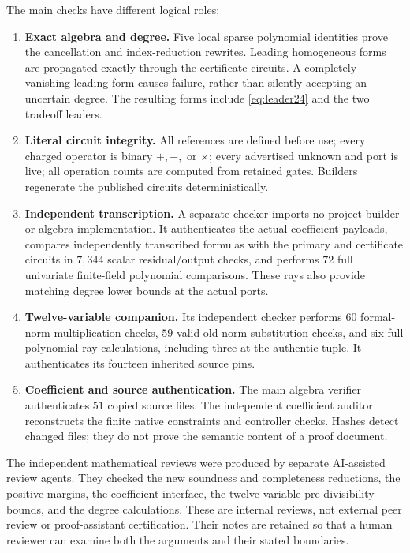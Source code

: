 \documentclass[11pt,a4paper]{article}
\theoremstyle{remark}
\begin{document}
The main checks have different logical roles:
\begin{enumerate}
 \item \textbf{Exact algebra and degree.} Five local sparse polynomial
 identities prove the cancellation and index-reduction rewrites. Leading
 homogeneous forms are propagated exactly through the certificate circuits.
 A completely vanishing leading form causes failure, rather than silently
 accepting an uncertain degree. The resulting forms include
 \eqref{eq:leader24} and the two tradeoff leaders.
 \item \textbf{Literal circuit integrity.} All references are defined before
 use; every charged operator is binary $+,-,$ or $\times$; every advertised
 unknown and port is live; all operation counts are computed from retained
 gates. Builders regenerate the published circuits deterministically.
 \item \textbf{Independent transcription.} A separate checker imports no
 project builder or algebra implementation. It authenticates the actual
 coefficient payloads, compares independently transcribed formulas with the
 primary and certificate circuits in $7{,}344$ scalar residual/output checks,
 and performs $72$ full univariate finite-field polynomial comparisons.
 These rays also provide matching degree lower bounds at the actual ports.
 \item \textbf{Twelve-variable companion.} Its independent checker performs
 $60$ formal-norm multiplication checks, $59$ valid old-norm substitution
 checks, and six full polynomial-ray calculations, including three at the
 authentic tuple. It authenticates its fourteen inherited source pins.
 \item \textbf{Coefficient and source authentication.} The main algebra
 verifier authenticates $51$ copied source files. The independent coefficient
 auditor reconstructs the finite native constraints and controller checks.
 Hashes detect changed files; they do not prove the semantic content of a
 proof document.
\end{enumerate}

The independent mathematical reviews were produced by separate AI-assisted
review agents. They checked the new soundness and completeness reductions,
the positive margins, the coefficient interface, the twelve-variable
pre-divisibility bounds, and the degree calculations. These are internal
reviews, not external peer review or proof-assistant certification. Their
notes are retained so that a human reviewer can examine both the arguments
and their stated boundaries.
\end{document}
